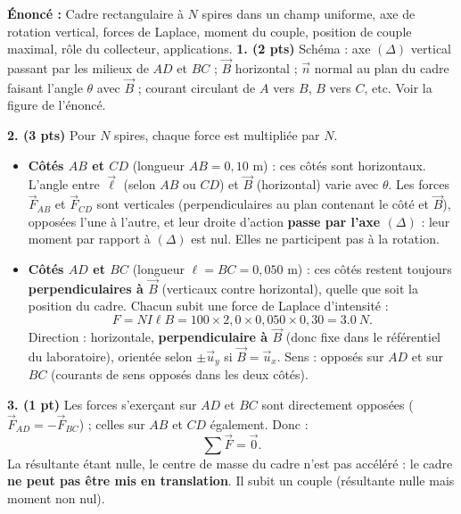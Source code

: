 \documentclass[11pt]{article}
\newcommand{\cle}[1]{{\popxbold\color{popdark}#1}}
\begin{document}
\begin{corrige}
\textbf{Énoncé :} Cadre rectangulaire à $N$ spires dans un champ uniforme, axe de rotation vertical, forces de Laplace, moment du couple, position de couple maximal, rôle du collecteur, applications.
\tcblower
\textbf{1. (2 pts)} Schéma : axe $(\Delta)$ vertical passant par les milieux de $AD$ et $BC$ ; $\vec{B}$ horizontal ; $\vec{n}$ normal au plan du cadre faisant l'angle $\theta$ avec $\vec{B}$ ; courant circulant de $A$ vers $B$, $B$ vers $C$, etc. Voir la figure de l'énoncé.

\textbf{2. (3 pts)} Pour $N$ spires, chaque force est multipliée par $N$.
\begin{itemize}
\item \textbf{Côtés $AB$ et $CD$} (longueur $AB = 0{,}10$ m) : ces côtés sont horizontaux. L'angle entre $\vec{\ell}$ (selon $AB$ ou $CD$) et $\vec{B}$ (horizontal) varie avec $\theta$. Les forces $\vec{F}_{AB}$ et $\vec{F}_{CD}$ sont verticales (perpendiculaires au plan contenant le côté et $\vec{B}$), opposées l'une à l'autre, et leur droite d'action \textbf{passe par l'axe $(\Delta)$} : leur moment par rapport à $(\Delta)$ est nul. Elles ne participent pas à la rotation.
\item \textbf{Côtés $AD$ et $BC$} (longueur $\ell = BC = 0{,}050$ m) : ces côtés restent toujours \textbf{perpendiculaires à $\vec{B}$} (verticaux contre horizontal), quelle que soit la position du cadre. Chacun subit une force de Laplace d'intensité :
\[ F = N I \ell B = 100\times 2{,}0\times 0{,}050\times 0{,}30 = \SI{3,0}{N}. \]
Direction : horizontale, \textbf{perpendiculaire à $\vec{B}$} (donc fixe dans le référentiel du laboratoire), orientée selon $\pm\vec{u}_y$ si $\vec{B}=\vec{u}_x$. Sens : opposés sur $AD$ et sur $BC$ (courants de sens opposés dans les deux côtés).
\end{itemize}

\textbf{3. (1 pt)} Les forces s'exerçant sur $AD$ et $BC$ sont directement opposées ($\vec{F}_{AD} = -\vec{F}_{BC}$) ; celles sur $AB$ et $CD$ également. Donc :
\[ \sum \vec{F} = \vec{0}. \]
La résultante étant nulle, le centre de masse du cadre n'est pas accéléré : le cadre \textbf{ne peut pas être mis en translation}. Il subit un \cle{couple} (résultante nulle mais moment non nul).


\end{corrige}
\end{document}
